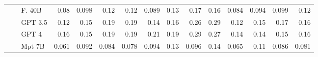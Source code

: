 \begin{table}[!htbp]
{\begin{tabular}{l|l|l|rrrr|rrrr|rrrr}
 &  & F. 40B  & {\cellcolor[HTML]{BDE5B6}} \color[HTML]{000000} 0.08 & {\cellcolor[HTML]{A2D99C}} \color[HTML]{000000} 0.098 & {\cellcolor[HTML]{81CA81}} \color[HTML]{000000} 0.12 & {\cellcolor[HTML]{79C67A}} \color[HTML]{000000} 0.12 & {\cellcolor[HTML]{FEDCB9}} \color[HTML]{000000} 0.089 & {\cellcolor[HTML]{FDC088}} \color[HTML]{000000} 0.13 & {\cellcolor[HTML]{FD9243}} \color[HTML]{000000} 0.17 & {\cellcolor[HTML]{FD9C51}} \color[HTML]{000000} 0.16 & {\cellcolor[HTML]{C0C1DE}} \color[HTML]{000000} 0.084 & {\cellcolor[HTML]{B2B2D5}} \color[HTML]{000000} 0.094 & {\cellcolor[HTML]{AAA8D0}} \color[HTML]{000000} 0.099 & {\cellcolor[HTML]{8F8CC1}} \color[HTML]{F1F1F1} 0.12 \\
 &  & GPT 3.5  & {\cellcolor[HTML]{76C578}} \color[HTML]{000000} 0.12 & {\cellcolor[HTML]{40AA5D}} \color[HTML]{F1F1F1} 0.15 & {\cellcolor[HTML]{0B7734}} \color[HTML]{F1F1F1} 0.19 & {\cellcolor[HTML]{0A7633}} \color[HTML]{F1F1F1} 0.19 & {\cellcolor[HTML]{FDB475}} \color[HTML]{000000} 0.14 & {\cellcolor[HTML]{FD9C51}} \color[HTML]{000000} 0.16 & {\cellcolor[HTML]{C84202}} \color[HTML]{F1F1F1} 0.26 & {\cellcolor[HTML]{9C3203}} \color[HTML]{F1F1F1} 0.29 & {\cellcolor[HTML]{8784BD}} \color[HTML]{F1F1F1} 0.12 & {\cellcolor[HTML]{6950A3}} \color[HTML]{F1F1F1} 0.15 & {\cellcolor[HTML]{582F93}} \color[HTML]{F1F1F1} 0.17 & {\cellcolor[HTML]{603E9A}} \color[HTML]{F1F1F1} 0.16 \\
 &  & GPT 4 & {\cellcolor[HTML]{319A50}} \color[HTML]{F1F1F1} 0.16 & {\cellcolor[HTML]{3FA95C}} \color[HTML]{F1F1F1} 0.15 & {\cellcolor[HTML]{077331}} \color[HTML]{F1F1F1} 0.19 & {\cellcolor[HTML]{03702E}} \color[HTML]{F1F1F1} 0.19 & {\cellcolor[HTML]{F16913}} \color[HTML]{F1F1F1} 0.21 & {\cellcolor[HTML]{F87F2C}} \color[HTML]{F1F1F1} 0.19 & {\cellcolor[HTML]{A23503}} \color[HTML]{F1F1F1} 0.29 & {\cellcolor[HTML]{BE3F02}} \color[HTML]{F1F1F1} 0.27 & {\cellcolor[HTML]{7262AC}} \color[HTML]{F1F1F1} 0.14 & {\cellcolor[HTML]{776AB0}} \color[HTML]{F1F1F1} 0.14 & {\cellcolor[HTML]{65479E}} \color[HTML]{F1F1F1} 0.15 & {\cellcolor[HTML]{5C3696}} \color[HTML]{F1F1F1} 0.16 \\
 &  & Mpt 7B & {\cellcolor[HTML]{D6EFD0}} \color[HTML]{000000} 0.061 & {\cellcolor[HTML]{AADDA4}} \color[HTML]{000000} 0.092 & {\cellcolor[HTML]{B7E2B1}} \color[HTML]{000000} 0.084 & {\cellcolor[HTML]{C0E6B9}} \color[HTML]{000000} 0.078 & {\cellcolor[HTML]{FDD9B4}} \color[HTML]{000000} 0.094 & {\cellcolor[HTML]{FDBD83}} \color[HTML]{000000} 0.13 & {\cellcolor[HTML]{FDD7B1}} \color[HTML]{000000} 0.096 & {\cellcolor[HTML]{FDB475}} \color[HTML]{000000} 0.14 & {\cellcolor[HTML]{DBDBEC}} \color[HTML]{000000} 0.065 & {\cellcolor[HTML]{9E9AC8}} \color[HTML]{F1F1F1} 0.11 & {\cellcolor[HTML]{BDBEDC}} \color[HTML]{000000} 0.086 & {\cellcolor[HTML]{C4C5E0}} \color[HTML]{000000} 0.081 \\

\end{tabular}}
\end{table}

